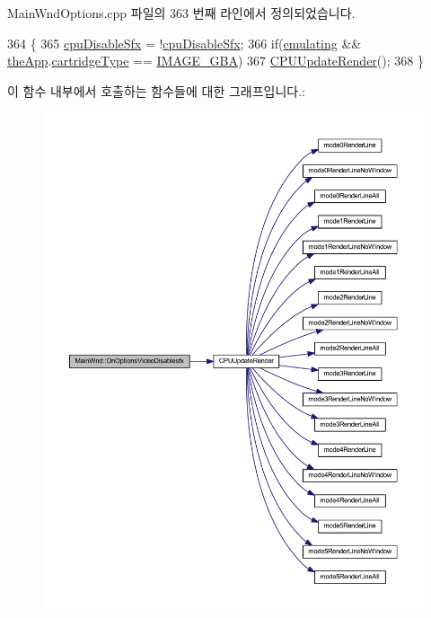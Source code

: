 Main\+Wnd\+Options.\+cpp 파일의 363 번째 라인에서 정의되었습니다.


\begin{DoxyCode}
364 \{
365   \mbox{\hyperlink{_globals_8cpp_a71b9f49fb3c59657da7fa489a52b615e}{cpuDisableSfx}} = !\mbox{\hyperlink{_globals_8cpp_a71b9f49fb3c59657da7fa489a52b615e}{cpuDisableSfx}};
366   \textcolor{keywordflow}{if}(\mbox{\hyperlink{_main_wnd_options_8cpp_af9cc36078b1b311753963297ae7f2a74}{emulating}} && \mbox{\hyperlink{_v_b_a_8cpp_a8095a9d06b37a7efe3723f3218ad8fb3}{theApp}}.\mbox{\hyperlink{class_v_b_a_af300759fcbc7eeb00ce73f956fc5ddb7}{cartridgeType}} == \mbox{\hyperlink{_util_8h_aef8b88d56fdf9a25f990a68d80c014d8a25f0ac1f3a37d568346fedece32e4bfb}{IMAGE\_GBA}})
367     \mbox{\hyperlink{_g_b_a_8cpp_aec5d70c1ebbb457c60697412625dc04a}{CPUUpdateRender}}();
368 \}
\end{DoxyCode}
이 함수 내부에서 호출하는 함수들에 대한 그래프입니다.\+:
\nopagebreak
\begin{figure}[H]
\begin{center}
\leavevmode
\includegraphics[width=350pt]{class_main_wnd_a18272b2ec178d9123804805b82fc3db6_cgraph}
\end{center}
\end{figure}
\mbox{\label{class_main_wnd_af40af1ba864ff1718ef3fe96279656d2}} 
